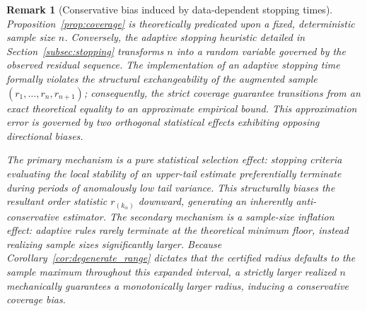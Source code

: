 \documentclass[a4paper]{cas-sc}
\newtheorem{remark}{Remark}
\newcommand{\residual}{\ensuremath{r}}
\begin{document}
\begin{remark}[Conservative bias induced by data-dependent stopping times]
\label{rem:optional_stopping}
Proposition~\ref{prop:coverage} is theoretically predicated upon a fixed, deterministic sample size \(n\). Conversely, the adaptive stopping heuristic detailed in Section~\ref{subsec:stopping} transforms \(n\) into a random variable governed by the observed residual sequence. The implementation of an adaptive stopping time formally violates the structural exchangeability of the augmented sample \((\residual_1,\ldots,\residual_n,\residual_{n+1})\); consequently, the strict coverage guarantee transitions from an exact theoretical equality to an approximate empirical bound. This approximation error is governed by two orthogonal statistical effects exhibiting opposing directional biases.

The primary mechanism is a pure statistical selection effect: stopping criteria evaluating the local stability of an upper-tail estimate preferentially terminate during periods of anomalously low tail variance. This structurally biases the resultant order statistic \(\residual_{(k_\alpha)}\) downward, generating an inherently anti-conservative estimator. The secondary mechanism is a sample-size inflation effect: adaptive rules rarely terminate at the theoretical minimum floor, instead realizing sample sizes significantly larger. Because Corollary~\ref{cor:degenerate_range} dictates that the certified radius defaults to the sample maximum throughout this expanded interval, a strictly larger realized \(n\) mechanically guarantees a monotonically larger radius, inducing a conservative coverage bias.


\end{remark}
\end{document}
